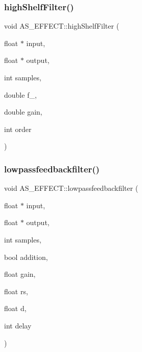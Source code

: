 \mbox{\label{class_a_s___e_f_f_e_c_t_a4b16d06bae51799e65684fc8ba86bf36}} 
\subsubsection{high\+Shelf\+Filter()}
{\footnotesize\ttfamily void A\+S\+\_\+\+E\+F\+F\+E\+C\+T\+::high\+Shelf\+Filter (\begin{DoxyParamCaption}\item[{float $\ast$}]{input,  }\item[{float $\ast$}]{output,  }\item[{int}]{samples,  }\item[{double}]{f\+\_,  }\item[{double}]{gain,  }\item[{int}]{order }\end{DoxyParamCaption})}

\mbox{\label{class_a_s___e_f_f_e_c_t_a22b1b9934dcdec996c480f0569697b7f}} 
\subsubsection{lowpassfeedbackfilter()}
{\footnotesize\ttfamily void A\+S\+\_\+\+E\+F\+F\+E\+C\+T\+::lowpassfeedbackfilter (\begin{DoxyParamCaption}\item[{float $\ast$}]{input,  }\item[{float $\ast$}]{output,  }\item[{int}]{samples,  }\item[{bool}]{addition,  }\item[{float}]{gain,  }\item[{float}]{rs,  }\item[{float}]{d,  }\item[{int}]{delay }\end{DoxyParamCaption})}

\mbox{\label{class_a_s___e_f_f_e_c_t_a4ddd97ef8b9be2e5d5917f2168ecbac5}} 
